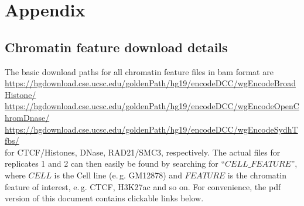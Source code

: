 \section{Appendix}

\subsection{Chromatin feature download details} \label{sec:chromFeat_download_links}
The basic download paths for all chromatin feature files in bam format are\\
\small{\url{https://hgdownload.cse.ucsc.edu/goldenPath/hg19/encodeDCC/wgEncodeBroadHistone/}}\\
\small{\url{https://hgdownload.cse.ucsc.edu/goldenPath/hg19/encodeDCC/wgEncodeOpenChromDnase/}}\\
\small{\url{https://hgdownload.cse.ucsc.edu/goldenPath/hg19/encodeDCC/wgEncodeSydhTfbs/}}\\
for CTCF/Histones, DNase, RAD21/SMC3, respectively. 
The actual files for replicates 1 and 2 can then easily be found by searching for ``$\mathit{CELL}\_\mathit{FEATURE}$'', 
where $\mathit{CELL}$ is the Cell line (e.\,g. GM12878) and $\mathit{FEATURE}$
is the chromatin feature of interest, e.\,g. CTCF, H3K27ac and so on.
For convenience, the pdf version of this document contains clickable links below.

